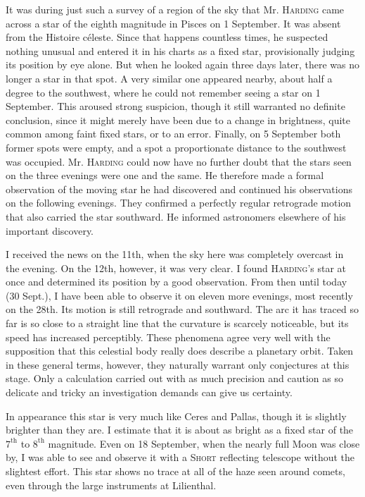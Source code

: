 It was during just such a survey of a region of the sky that Mr. \textsc{Harding} came across a star of the eighth magnitude in Pisces on 1 September. It was absent from the Histoire céleste. Since that happens countless times, he suspected nothing unusual and entered it in his charts as a fixed star, provisionally judging its position by eye alone. But when he looked again three days later, there was no longer a star in that spot. A very similar one appeared nearby, about half a degree to the southwest, where he could not remember seeing a star on 1 September. This aroused strong suspicion, though it still warranted no definite conclusion, since it might merely have been due to a change in brightness, quite common among faint fixed stars, or to an error. Finally, on 5 September both former spots were empty, and a spot a proportionate distance to the southwest was occupied. Mr. \textsc{Harding} could now have no further doubt that the stars seen on the three evenings were one and the same. He therefore made a formal observation of the moving star he had discovered and continued his observations on the following evenings. They confirmed a perfectly regular retrograde motion that also carried the star southward. He informed astronomers elsewhere of his important discovery.

I received the news on the 11th, when the sky here was completely overcast in the evening. On the 12th, however, it was very clear. I found \textsc{Harding}’s star at once and determined its position by a good observation. From then until today (30 Sept.), I have been able to observe it on eleven more evenings, most recently on the 28th. Its motion is still retrograde and southward. The arc it has traced so far is so close to a straight line that the curvature is scarcely noticeable, but its speed has increased perceptibly. These phenomena agree very well with the supposition that this celestial body really does describe a planetary orbit. Taken in these general terms, however, they naturally warrant only conjectures at this stage. Only a
calculation carried out with as much precision and caution as so delicate and tricky an investigation demands can give us certainty.

In appearance this star is very much like Ceres and Pallas, though it is slightly brighter than they are. I estimate that it is about as bright as a fixed star of the $7^{\mathrm{th}}$ to $8^{\mathrm{th}}$ magnitude. Even on 18 September, when the nearly full Moon was close by, I was able to see and observe it with a \textsc{Short} reflecting telescope without the slightest effort. This star shows no trace at all of the haze seen around comets, even through the large instruments at Lilienthal.


